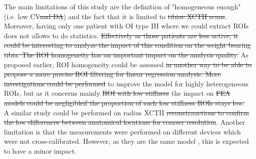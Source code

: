 \documentclass[a4paper,fleqn]{DC_ArtStyle}
\providecommand{\DIFadd}[1]{{\protect\color{blue}{#1}}} %
\providecommand{\DIFdel}[1]{{\protect\color{red}\sout{#1}}}                      %
\providecommand{\DIFaddbegin}{} %
\providecommand{\DIFaddend}{} %
\providecommand{\DIFdelbegin}{} %
\providecommand{\DIFdelend}{} %
\begin{document}
The main limitations of this study are the definition of "homogeneous enough" (i.e. low CV\DIFdelbegin \DIFdel{and DA}\DIFdelend ) and the fact that it is limited to  \DIFdelbegin \DIFdel{tibiae XCTII scans}\DIFdelend \DIFaddbegin \DIFadd{XCTII reconstructions of the distal tibia}\DIFaddend . Moreover, having only one patient with OI type III where we could extract ROIs does not allows to do statistics. \DIFdelbegin \DIFdel{Effectively as those patients are less active, it could be interesting to analyze the impact of this condition on the weight bearing tibia. The ROI homogeneity has an important impact on the analysis quality. }\DIFdelend %
\DIFaddbegin \DIFadd{ROI homogeneity is a necessary condition underlying homogenisation of mechanical properties and the use of fabric-elasticity relationships. %
}\DIFaddend As proposed earlier, ROI homogeneity could be assessed \DIFdelbegin \DIFdel{in another way to be able to propose a more precise ROI filtering for linear regression analysis. More investigations could be performed }\DIFdelend \DIFaddbegin \DIFadd{with an alternative ROI filtering and more efforts could be invested }\DIFaddend to improve the model for highly heterogeneous ROIs, but as it concerns mainly \DIFdelbegin \DIFdel{ROI with low stiffness }\DIFdelend \DIFaddbegin \DIFadd{ROIs with extremely low stiffness, }\DIFaddend the impact on \DIFdelbegin \DIFdel{FEA models could be negligibleif the proportion of such low stiffness ROIs stays low.
}\DIFdelend \DIFaddbegin \DIFadd{hFE models should remain negligible.
}\DIFaddend A similar study could be performed on radius XCTII \DIFdelbegin \DIFdel{reconstrauctions to confirm the low differences between anatomical locations for coarser resolution}\DIFdelend \DIFaddbegin \DIFadd{reconstructions to generalise the above findings}\DIFaddend . Another limitation is that the measurements were performed on different \DIFaddbegin \DIFadd{HR-pQCT }\DIFaddend devices which were not cross-calibrated. However, as they are the same model \DIFaddbegin \DIFadd{(XCTII) and the quality control measurement ensures $\pm$ 1\% precision on BMD}\DIFaddend , this is expected to have a minor impact. \\
\end{document}
